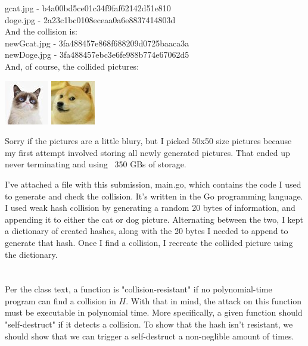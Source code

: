 \documentclass[10pt]{article}
\begin{document}
\noindent gcat.jpg - b4a00bd5ce01c34f9faf62142d51e810\\
\noindent doge.jpg - 2a23c1bc0108eceaa0a6e8837414803d\\

\noindent And the collision is:\\

\noindent newGcat.jpg - 3fa488457e868f688209d0725baaca3a\\
\noindent newDoge.jpg - 3fa488457ebc3e6fe988b774e67062d5\\

\noindent And, of course, the collided pictures:

\includegraphics{newGcat.jpg}
\includegraphics{newDoge.jpg}

Sorry if the pictures are a little blury, but I picked 50x50 size pictures
because my first attempt involved storing all newly generated pictures. That
ended up never terminating and using ~350 GBs of storage. 

I've attached a file with this submission, main.go, which contains the code I used
to generate and check the collision. It's written in the Go programming language.
I used weak hash collision by generating a random 20 bytes of information, and
appending it to either the cat or dog picture. Alternating between the two, I 
kept a dictionary of created hashes, along with the 20 bytes I needed to append
to generate that hash. Once I find a collision, I recreate the collided picture
using the dictionary. 

\section{}
Per the class text, a function is "collision-resistant" if no polynomial-time
program can find a collision in $H$. With that in mind, the attack on this
function must be executable in polynomial time. More specifically, a given
function should "self-destruct" if it detects a collision. To show that the 
hash isn't resistant, we should show that we can trigger a self-destruct a
non-neglible amount of times. 
\end{document}
